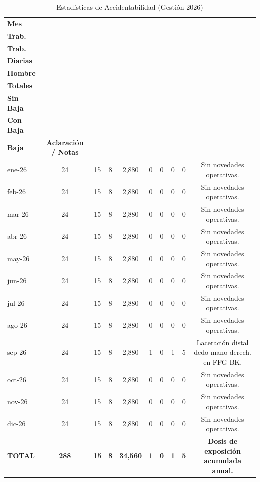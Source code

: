 \documentclass[11pt, letterpaper]{article}
\begin{document}
\begin{table}[H]
    \centering
    \footnotesize
    \caption{Estadísticas de Accidentabilidad (Gestión 2026)}
    \begin{tabular}{lccccccccc}
        \toprule
        \textbf{Mes} & 
        \shortstack{\textbf{Días} \\ \textbf{Trab.}} & 
        \shortstack{\textbf{Prom.} \\ \textbf{Trab.}} & 
        \shortstack{\textbf{Horas} \\ \textbf{Diarias}} & 
        \shortstack{\textbf{Horas} \\ \textbf{Hombre}} & 
        \shortstack{\textbf{Accid.} \\ \textbf{Totales}} & 
        \shortstack{\textbf{Accid.} \\ \textbf{Sin Baja}} & 
        \shortstack{\textbf{Accid.} \\ \textbf{Con Baja}} & 
        \shortstack{\textbf{Días} \\ \textbf{Baja}} & 
        \textbf{Aclaración / Notas} \\
        \midrule
        ene-26 & 24 & 15 & 8 & 2,880 & 0 & 0 & 0 & 0 & Sin novedades operativas. \\
        feb-26 & 24 & 15 & 8 & 2,880 & 0 & 0 & 0 & 0 & Sin novedades operativas. \\
        mar-26 & 24 & 15 & 8 & 2,880 & 0 & 0 & 0 & 0 & Sin novedades operativas. \\
        abr-26 & 24 & 15 & 8 & 2,880 & 0 & 0 & 0 & 0 & Sin novedades operativas. \\
        may-26 & 24 & 15 & 8 & 2,880 & 0 & 0 & 0 & 0 & Sin novedades operativas. \\
        jun-26 & 24 & 15 & 8 & 2,880 & 0 & 0 & 0 & 0 & Sin novedades operativas. \\
        jul-26 & 24 & 15 & 8 & 2,880 & 0 & 0 & 0 & 0 & Sin novedades operativas. \\
        ago-26 & 24 & 15 & 8 & 2,880 & 0 & 0 & 0 & 0 & Sin novedades operativas. \\
        sep-26 & 24 & 15 & 8 & 2,880 & 1 & 0 & 1 & 5 & Laceración distal dedo mano derech. en FFG BK. \\
        oct-26 & 24 & 15 & 8 & 2,880 & 0 & 0 & 0 & 0 & Sin novedades operativas. \\
        nov-26 & 24 & 15 & 8 & 2,880 & 0 & 0 & 0 & 0 & Sin novedades operativas. \\
        dic-26 & 24 & 15 & 8 & 2,880 & 0 & 0 & 0 & 0 & Sin novedades operativas. \\
        \midrule
        \textbf{TOTAL} & \textbf{288} & \textbf{15} & \textbf{8} & \textbf{34,560} & \textbf{1} & \textbf{0} & \textbf{1} & \textbf{5} & \textbf{Dosis de exposición acumulada anual.} \\
        \bottomrule
    \end{tabular}
\end{table}
\end{document}
